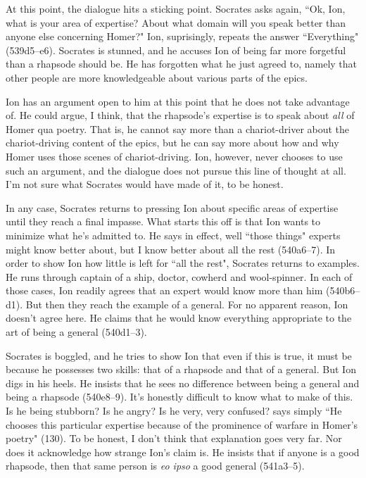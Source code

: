 \documentclass[12pt,letterpaper]{article}
\begin{document}
At this point, the dialogue hits a sticking point. Socrates asks again, ``Ok, Ion, what is your area of expertise? About what domain will you speak better than anyone else concerning Homer?" Ion, suprisingly, repeats the answer ``Everything" (539d5--e6). Socrates is stunned, and he accuses Ion of being far more forgetful than a rhapsode should be. He has forgotten what he just agreed to, namely that other people are more knowledgeable about various parts of the epics.

Ion has an argument open to him at this point that he does not take advantage of. He could argue, I think, that the rhapsode's expertise is to speak about \emph{all} of Homer qua poetry. That is, he cannot say more than a chariot-driver about the chariot-driving content of the epics, but he can say more about how and why Homer uses those scenes of chariot-driving. Ion, however, never chooses to use such an argument, and the dialogue does not pursue this line of thought at all. I'm not sure what Socrates would have made of it, to be honest.

In any case, Socrates returns to pressing Ion about specific areas of
expertise until they reach a final impasse. What starts this off is that
Ion wants to minimize what he's admitted to. He says in effect, well
``those things" experts might know better about, but I know better about
all the rest (540a6--7). In order to show Ion how little is left for ``all
the rest", Socrates returns to examples. He runs through captain of
a ship, doctor, cowherd and wool-spinner. In each of those cases, Ion
readily agrees that an expert would know more than him (540b6--d1). But
then they reach the example of a general. For no apparent reason, Ion
doesn't agree here. He claims that he would know everything appropriate to
the art of being a general (540d1--3).

Socrates is boggled, and he tries to show Ion that even if this is true, it must be because he possesses two skills: that of a rhapsode and that of a general. But Ion digs in his heels. He insists that he sees no difference between being a general and being a rhapsode (540e8--9). It's honestly difficult to know what to make of this. Is he being stubborn? Is he angry?  Is he very, very confused? \textcite{murray1996} says simply ``He chooses this particular expertise because of the prominence of warfare in Homer's poetry" (130). To be honest, I don't think that explanation goes very far. Nor does it acknowledge how strange Ion's claim is. He insists that if anyone is a good rhapsode, then that same person is \textit{eo ipso} a good general (541a3--5).
\end{document}

